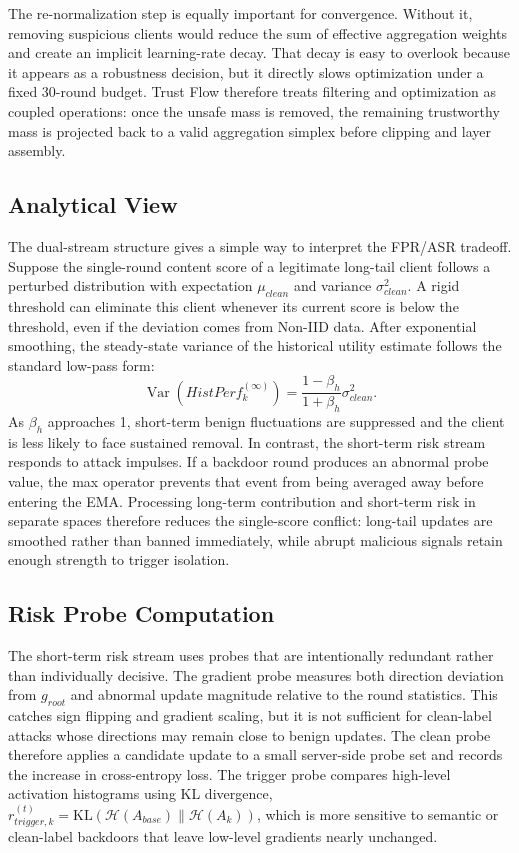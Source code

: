 \documentclass[runningheads,orivec]{llncs}
\begin{document}
The re-normalization step is equally important for convergence. Without it, removing suspicious clients would reduce the sum of effective aggregation weights and create an implicit learning-rate decay. That decay is easy to overlook because it appears as a robustness decision, but it directly slows optimization under a fixed 30-round budget. Trust Flow therefore treats filtering and optimization as coupled operations: once the unsafe mass is removed, the remaining trustworthy mass is projected back to a valid aggregation simplex before clipping and layer assembly.

\subsection{Analytical View}

The dual-stream structure gives a simple way to interpret the FPR/ASR tradeoff. Suppose the single-round content score of a legitimate long-tail client follows a perturbed distribution with expectation $\mu_{clean}$ and variance $\sigma_{clean}^2$. A rigid threshold can eliminate this client whenever its current score is below the threshold, even if the deviation comes from Non-IID data. After exponential smoothing, the steady-state variance of the historical utility estimate follows the standard low-pass form:
\begin{equation}
    \operatorname{Var}(HistPerf_k^{(\infty)})=\frac{1-\beta_h}{1+\beta_h}\sigma_{clean}^2 .
\end{equation}
As $\beta_h$ approaches 1, short-term benign fluctuations are suppressed and the client is less likely to face sustained removal. In contrast, the short-term risk stream responds to attack impulses. If a backdoor round produces an abnormal probe value, the max operator prevents that event from being averaged away before entering the EMA. Processing long-term contribution and short-term risk in separate spaces therefore reduces the single-score conflict: long-tail updates are smoothed rather than banned immediately, while abrupt malicious signals retain enough strength to trigger isolation.

\subsection{Risk Probe Computation}

The short-term risk stream uses probes that are intentionally redundant rather than individually decisive. The gradient probe measures both direction deviation from $g_{root}$ and abnormal update magnitude relative to the round statistics. This catches sign flipping and gradient scaling, but it is not sufficient for clean-label attacks whose directions may remain close to benign updates. The clean probe therefore applies a candidate update to a small server-side probe set and records the increase in cross-entropy loss. The trigger probe compares high-level activation histograms using KL divergence, $r_{trigger,k}^{(t)}=\mathrm{KL}(\mathcal{H}(A_{base})\|\mathcal{H}(A_k))$, which is more sensitive to semantic or clean-label backdoors that leave low-level gradients nearly unchanged.
\end{document}
